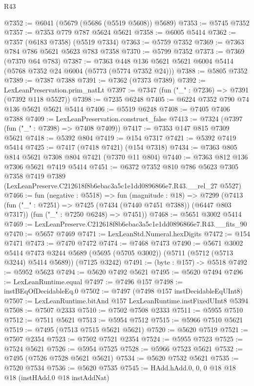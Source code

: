 \begin{lexlean}{R43}
\begin{coremodule}
@7352 := @6041 (@5679 (@5686 (@5519 @5608)) @5689)
@7353 := @5745 @7352
@7357 := @7353 @779 @787 @5624 @5621
@7358 := @6005 @5414
@7362 := @7357 (@6183 @7358) (@5519 @7334)
@7363 := @5759 @7352
@7369 := @7363 @784 @786 @5621 @5623 @783 @7358
@7370 := @5799 @7352
@7373 := @7369 (@7370 @64 @783)
@7387 := @7363 @448 @136 @5621 @5621 @6004 @5414 (@5768 @7352 @24 @6004 (@5773 (@5774 @7352 @24)))
@7388 := @5805 @7352
@7389 := @7387 @7388
@7391 := @7362 (@7373 @7389)
@7392 := LexLeanPreservation.prim_natLt
@7397 := @7347 (fun ("_" : @7236) => @7391 (@7392 @118 @5527))
@7398 := @7235 @6248
@7405 := @6224 @7352 @790 @74 @136 @5621 @5621 @5414
@7406 := @5519 @6248
@7408 := @7405 @7406 @7388
@7409 := LexLeanPreservation.construct_false
@7413 := @7324 (@7397 (fun ("_" : @7398) => @7408 @7409))
@7417 := @7353 @147 @815 @7309 @5621
@7418 := @5392 @804
@7419 := @154 @7317
@7421 := @5392 @7419 @5414
@7425 := @7417 (@7418 @7421) (@154 @7318)
@7434 := @7363 @805 @814 @5621 @7308 @804 @7421 (@7370 @11 @804)
@7440 := @7363 @812 @136 @7306 @5621 @7419 @5414
@7451 := @6372
    @7352
    @810
    @786
    @5623
    @7305
    @7358
    @7419
    @7389
    (LexLeanPreserve.C212618f8b6ebac3a5c1e1dd0896866e7.R43.__rel_27 @5527)
@7466 := fun (negative : @5518) =>
  fun (magnitude : @18) =>
  @7299
    (@7413
      (fun ("_" : @7251) => @7425 (@7434 (@7440 @7451 @7388)) (@6447 @803 @7317))
      (fun ("_" : @7250 @6248) => @7451))
@7468 := @5651 @3002 @5414
@7469 := LexLeanPreserve.C212618f8b6ebac3a5c1e1dd0896866e7.R43.__fits_90
@7470 := @5657 @7469
@7471 := LexLeanStd.Numeral.hexDigits
@7472 := @154 @7471
@7473 := @7470 @7472
@7474 := @7468 @7473
@7490 := @5671
    @3002
    @5414
    @7473
    @3244
    @5689
    (@5695 (@5705 @3002))
    (@5711 (@5712 (@5713 @3244) @5414 @5689))
    (@7125 @3242)
@7491 := (byte : @157) -> @5518
@7492 := @5952 @5623
@7494 := @5620 @7492 @5621
@7495 := @5620 @7494
@7496 := LexLeanRuntime.equal
@7497 := @7496 @157
@7498 := instBEqOfDecidableEq.{0}
@7502 := @7497 (@7498 @157 instDecidableEqUInt8)
@7507 := LexLeanRuntime.bitAnd @157 LexLeanRuntime.instFixedUInt8 @5394
@7508 := @7507 @2333
@7510 := @7502 @7508 @2333
@7511 := @5955 @7510
@7512 := @7511 @5621
@7513 := @5954 @7512
@7515 := @5966 @7510 @5621
@7519 := @7495 (@7513 @7515 @5621 @5621)
@7520 := @5620 @7519
@7521 := @7507 @2354
@7523 := @7502 @7521 @2354
@7524 := @5955 @7523
@7525 := @7524 @5621
@7526 := @5954 @7525
@7528 := @5966 @7523 @5621
@7532 := @7495 (@7526 @7528 @5621 @5621)
@7534 := @5620 @7532 @5621
@7535 := @7520 @7534
@7536 := @5620 @7535
@7545 := HAdd.hAdd.{0, 0, 0} @18 @18 @18 (instHAdd.{0} @18 instAddNat)

\end{coremodule}
\end{lexlean}
